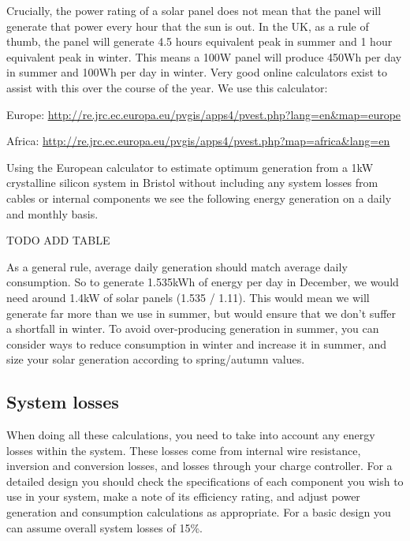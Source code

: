 \documentclass{article}
\theoremstyle{definition}
\theoremstyle{definition}
\theoremstyle{remark}
\begin{document}
    Crucially, the power rating of a solar panel does not mean that the panel will generate that power every hour that the sun is out. In the UK, as a rule of thumb, the panel will generate 4.5 hours equivalent peak in summer and 1 hour equivalent peak in winter. This means a 100W panel will produce 450Wh per day in summer and 100Wh per day in winter. Very good online calculators exist to assist with this over the course of the year. We use this calculator:

    Europe: \href{http://re.jrc.ec.europa.eu/pvgis/apps4/pvest.php?lang=en\&map=europe}{\underline{http://re.jrc.ec.europa.eu/pvgis/apps4/pvest.php?lang=en\&map=europe}}

    Africa: \href{http://re.jrc.ec.europa.eu/pvgis/apps4/pvest.php?map=africa\&lang=en}{\underline{http://re.jrc.ec.europa.eu/pvgis/apps4/pvest.php?map=africa\&lang=en}}

    Using the European calculator to estimate optimum generation from a 1kW crystalline silicon system in Bristol without including any system losses from cables or internal components we see the following energy generation on a daily and monthly basis.

    TODO ADD TABLE

    As a general rule, average daily generation should match average daily consumption. So to generate 1.535kWh of energy per day in December, we would need around 1.4kW of solar panels (1.535 / 1.11). This would mean we will generate far more than we use in summer, but would ensure that we don’t suffer a shortfall in winter. To avoid over-producing generation in summer, you can consider ways to reduce consumption in winter and increase it in summer, and size your solar generation according to spring/autumn values.
  

  {\color{blue}\subsection{System losses}} %
  \label{sub:system_losses}

    When doing all these calculations, you need to take into account any energy losses within the system. These losses come from internal wire resistance, inversion and conversion losses, and losses through your charge controller. For a detailed design you should check the specifications of each component you wish to use in your system, make a note of its efficiency rating, and adjust power generation and consumption calculations as appropriate. For a basic design you can assume overall system losses of 15\%.
\end{document}
